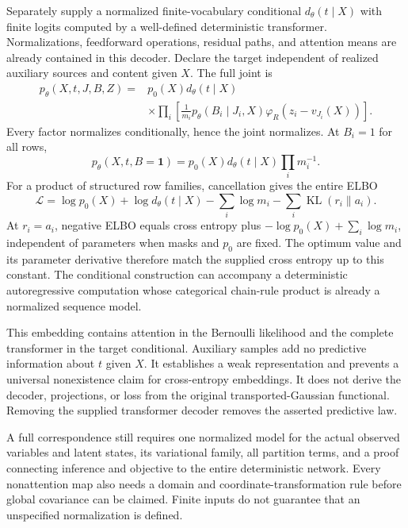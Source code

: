 \documentclass[11pt]{article}
\newcommand{\KL}{\operatorname{KL}}
\begin{document}
Separately supply a normalized finite-vocabulary conditional $d_\theta(t\mid X)$ with finite logits computed by a well-defined deterministic transformer. Normalizations, feedforward operations, residual paths, and attention means are already contained in this decoder. Declare the target independent of realized auxiliary sources and content given $X$. The full joint is
\begin{equation}
\begin{split}
p_\theta(X,t,J,B,Z)={}&p_0(X)d_\theta(t\mid X)\\
&\times\prod_i\left[\frac1{m_i}p_\theta(B_i\mid J_i,X)
\varphi_R(z_i-v_{J_i}(X))\right].
\end{split}
\label{eq:manufactured-joint}
\end{equation}
Every factor normalizes conditionally, hence the joint normalizes. At $B_i=1$ for all rows,
\begin{equation}
p_\theta(X,t,B=\mathbf1)=p_0(X)d_\theta(t\mid X)\prod_i m_i^{-1}.
\label{eq:manufactured-evidence}
\end{equation}
For a product of structured row families, cancellation gives the entire ELBO
\begin{equation}
\mathcal L=\log p_0(X)+\log d_\theta(t\mid X)-\sum_i\log m_i-\sum_i\KL(r_i\|a_i).
\label{eq:manufactured-elbo}
\end{equation}
At $r_i=a_i$, negative ELBO equals cross entropy plus $-\log p_0(X)+\sum_i\log m_i$, independent of parameters when masks and $p_0$ are fixed. The optimum value and its parameter derivative therefore match the supplied cross entropy up to this constant. The conditional construction can accompany a deterministic autoregressive computation whose categorical chain-rule product is already a normalized sequence model.

This embedding contains attention in the Bernoulli likelihood and the complete transformer in the target conditional. Auxiliary samples add no predictive information about $t$ given $X$. It establishes a weak representation and prevents a universal nonexistence claim for cross-entropy embeddings. It does not derive the decoder, projections, or loss from the original transported-Gaussian functional. Removing the supplied transformer decoder removes the asserted predictive law.

A full correspondence still requires one normalized model for the actual observed variables and latent states, its variational family, all partition terms, and a proof connecting inference and objective to the entire deterministic network. Every nonattention map also needs a domain and coordinate-transformation rule before global covariance can be claimed. Finite inputs do not guarantee that an unspecified normalization is defined.
\end{document}
